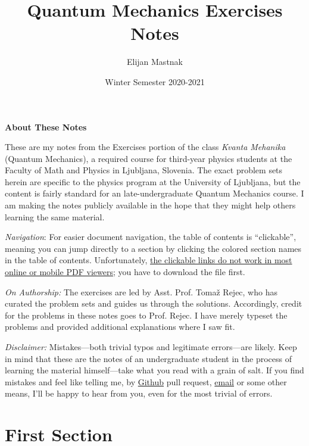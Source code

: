 \documentclass[11pt, a4paper]{article}
\begin{document}
\title{Quantum Mechanics Exercises Notes}
\author{Elijan Mastnak}
\date{Winter Semester 2020-2021}
\maketitle


\begin{center}
\textbf{About These Notes}
\end{center}

These are my notes from the Exercises portion of the class \textit{Kvanta Mehanika} (Quantum Mechanics), a required course for third-year physics students at the Faculty of Math and Physics in Ljubljana, Slovenia. The exact problem sets herein are specific to the physics program at the University of Ljubljana, but the content is fairly standard for an late-undergraduate Quantum Mechanics course. I am making the notes publicly available in the hope that they might help others learning the same material.

\vspace{2mm}
\textit{Navigation}: For easier document navigation, the table of contents is ``clickable'', meaning you can jump directly to a section by clicking the colored section names in the table of contents. Unfortunately, \uline{the clickable links do not work in most online or mobile PDF viewers}; you have to download the file first.

\vspace{2mm}
\textit{On Authorship:} 
The exercises are led by Asst. Prof. Toma\v{z} Rejec, who has curated the problem sets and guides us through the solutions. Accordingly, credit for the problems in these notes goes to Prof. Rejec. I have merely typeset the problems and provided additional explanations where I saw fit.

\vspace{2mm}
\textit{Disclaimer:} Mistakes---both trivial typos and legitimate errors---are likely. Keep in mind that these are the notes of an undergraduate student in the process of learning the material himself---take what you read with a grain of salt. If you find mistakes and feel like telling me, by \href{https://github.com/ejmastnak/fmf}{Github} pull request, \href{mailto:ejmastnak@gmail.com}{email} or some other means, I'll be happy to hear from you, even for the most trivial of errors.


\tableofcontents

\newpage

\section{First Section}
\end{document}
